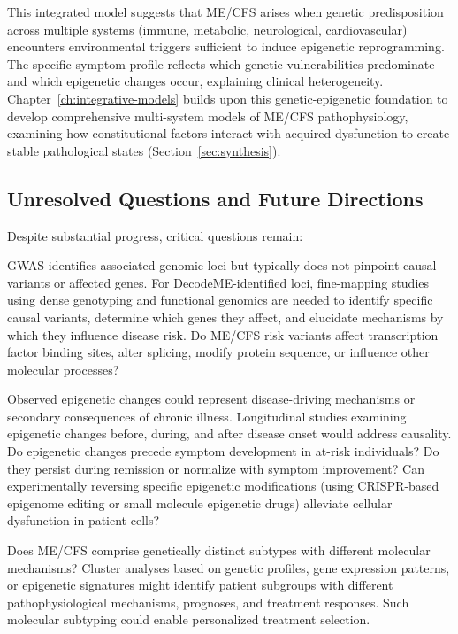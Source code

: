 This integrated model suggests that ME/CFS arises when genetic predisposition across multiple systems (immune, metabolic, neurological, cardiovascular) encounters environmental triggers sufficient to induce epigenetic reprogramming. The specific symptom profile reflects which genetic vulnerabilities predominate and which epigenetic changes occur, explaining clinical heterogeneity. Chapter~\ref{ch:integrative-models} builds upon this genetic-epigenetic foundation to develop comprehensive multi-system models of ME/CFS pathophysiology, examining how constitutional factors interact with acquired dysfunction to create stable pathological states (Section~\ref{sec:synthesis}).

\subsection{Unresolved Questions and Future Directions}

Despite substantial progress, critical questions remain:

\begin{open_question}
GWAS identifies associated genomic loci but typically does not pinpoint causal variants or affected genes. For DecodeME-identified loci, fine-mapping studies using dense genotyping and functional genomics are needed to identify specific causal variants, determine which genes they affect, and elucidate mechanisms by which they influence disease risk. Do ME/CFS risk variants affect transcription factor binding sites, alter splicing, modify protein sequence, or influence other molecular processes?
\end{open_question}

\begin{open_question}
Observed epigenetic changes could represent disease-driving mechanisms or secondary consequences of chronic illness. Longitudinal studies examining epigenetic changes before, during, and after disease onset would address causality. Do epigenetic changes precede symptom development in at-risk individuals? Do they persist during remission or normalize with symptom improvement? Can experimentally reversing specific epigenetic modifications (using CRISPR-based epigenome editing or small molecule epigenetic drugs) alleviate cellular dysfunction in patient cells?
\end{open_question}

\begin{open_question}
Does ME/CFS comprise genetically distinct subtypes with different molecular mechanisms? Cluster analyses based on genetic profiles, gene expression patterns, or epigenetic signatures might identify patient subgroups with different pathophysiological mechanisms, prognoses, and treatment responses. Such molecular subtyping could enable personalized treatment selection.
\end{open_question}

